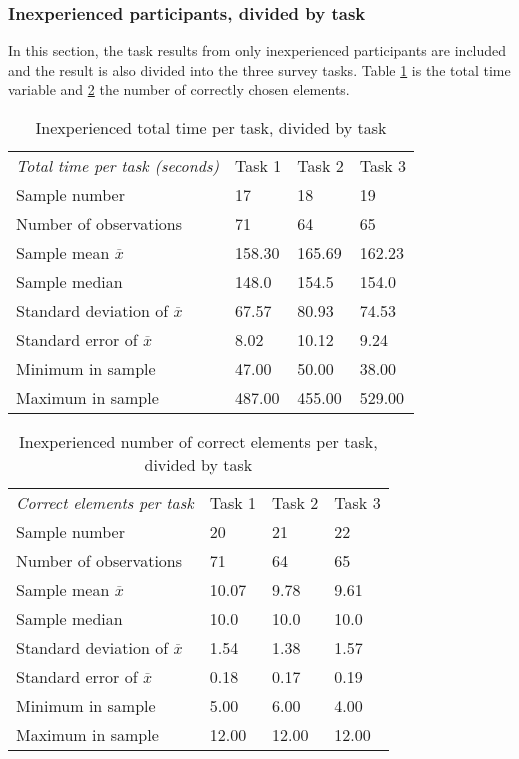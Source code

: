 \subsubsection{Inexperienced participants, divided by task}\label{sec:taskdivided_inexperienced}

In this section, the task results from only inexperienced participants are included and the result is also divided into the three survey tasks. 
Table \ref{tab:totaltime_tasks_inexperienced} is the total time variable and \ref{tab:totalcorrect_tasks_inexperienced} the number of correctly chosen elements. 

\begin{table}[H]
	\centering
	\begin{tabular}{l|l|l|l}
		\textit{Total time per task (seconds)} & Task 1 & Task 2 & Task 3 \\ 
		Sample number & 17 & 18 & 19 \\ \hline
		Number of observations & 71    & 64  & 65   \\
		Sample mean $\overline{x}$  & 158.30  &  165.69  &  162.23  \\
		Sample median & 148.0  &  154.5  &  154.0  \\
		Standard deviation of $\overline{x}$  & 67.57 & 80.93 & 74.53  \\
		Standard error of $\overline{x}$  & 8.02  & 10.12 & 9.24  \\
		Minimum in sample & 47.00 & 50.00 &  38.00 \\
		Maximum in sample & 487.00 & 455.00  & 529.00  \\ \hline
	\end{tabular}
	\caption[Total time, inexperienced per task]{Inexperienced total time per task, divided by task}
	\label{tab:totaltime_tasks_inexperienced}
\end{table}

\begin{table}[H]
	\centering
	\begin{tabular}{l|l|l|l}
		\textit{Correct elements per task} & Task 1 & Task 2 & Task 3 \\ 
		Sample number & 20 & 21 & 22 \\ \hline
		Number of observations & 71 & 64  & 65 \\
		Sample mean $\overline{x}$  & 10.07  &  9.78 &  9.61  \\
		Sample median  & 10.0  & 10.0  &  10.0  \\
		Standard deviation of $\overline{x}$  & 1.54  & 1.38  & 1.57   \\
		Standard error of $\overline{x}$  & 0.18 & 0.17 & 0.19  \\
		Minimum in sample  & 5.00 & 6.00 &  4.00  \\
		Maximum in sample  & 12.00 & 12.00  & 12.00 \\ \hline
	\end{tabular}
	\caption[Correct elements, inexperienced per task]{Inexperienced number of correct elements per task, divided by task}
	\label{tab:totalcorrect_tasks_inexperienced}
\end{table}

